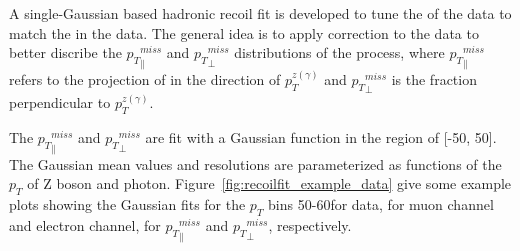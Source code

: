\vspace{0.3cm}
A single-Gaussian based hadronic recoil fit is developed to tune the \ptmiss of the \gjets data to match the \ptmiss in the \Zjets data. The general idea is to apply correction to the \gjets data to better discribe the ${p_{T}}^{miss}_\parallel$ and ${p_{T}}^{miss}_\perp$ distributions of the \Zjets process, where ${p_{T}}^{miss}_\parallel$ refers to the projection of \ptmiss in the direction of ${p}_{T}^{z(\gamma)}$ and ${p_{T}}^{miss}_\perp$ is the fraction perpendicular to ${p}_{T}^{z(\gamma)}$. 

\vspace{0.3cm}
The ${p_{T}}^{miss}_\parallel$ and ${p_{T}}^{miss}_\perp$ are fit with a Gaussian function in the region of [-50, 50]\GeV. The Gaussian mean values and resolutions are parameterized as functions of the $p_T$ of Z boson and photon. Figure~\ref{fig:recoilfit_example_data} give some example plots showing the Gaussian fits for the $p_T$ bins 50-60\GeV for \Zjets data, for muon channel and electron channel, for ${p_{T}}^{miss}_\parallel$ and ${p_{T}}^{miss}_\perp$, respectively.
